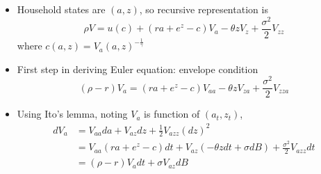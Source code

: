 \documentclass[10pt]{beamer}
\begin{document}
\begin{frame}{}
\begin{itemize}
\item Household states are $(a, z)$, so recursive representation is 
\begin{equation*}
	\rho V = u(c) + (r a + e^z - c) V_a - \theta z V_z + \frac{\sigma^2}{2} V_{zz}
\end{equation*}
where $c(a, z) = V_a(a, z)^{- \frac{1}{\gamma}}$

\item First step in deriving Euler equation: envelope condition
\begin{equation*}
	(\rho - r) V_a = (ra + e^z - c) V_{aa} - \theta z V_{z a} + \frac{\sigma^2}{2} V_{zz a }
\end{equation*}

\item Using Ito's lemma, noting $V_a$ is function of $(a_t, z_t)$, 
\begin{align*}
	dV_a &= V_{aa} da + V_{az} dz + \frac{1}{2} V_{azz} (dz)^2 \\
	&= V_{aa} (r a + e^z - c) dt + V_{az} (- \theta z dt + \sigma dB) + \frac{\sigma^2}{2} V_{azz} dt \\
	&= (\rho - r)V_a dt +  \sigma V_{az} dB
\end{align*}
\end{itemize}
\end{frame}
\end{document}
